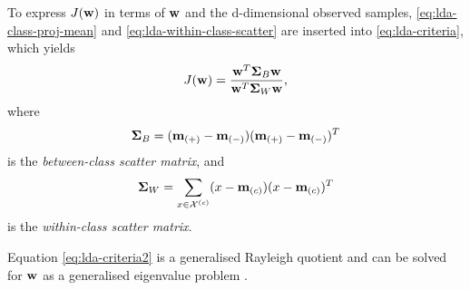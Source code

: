 To express $J(\mathbf{w})$ in terms of $\mathbf{w}$ and the d-dimensional observed samples, \eqref{eq:lda-class-proj-mean} and \eqref{eq:lda-within-class-scatter} are inserted into \eqref{eq:lda-criteria}, which yields
\begin{equation}
\label{eq:lda-criteria2}
J(\w) = \frac{\w^T \Scat_B \w}{\w^T \Scat_W \w},
\end{equation}
where 
\begin{equation}
\label{lda-b-scatter}
\Scat_B = (\m_{(+)}-\m_{(-)})(\m_{(+)}-\m_{(-)})^T
\end{equation}
is the \emph{between-class scatter matrix}, and 
\begin{equation}
\label{lda-w-scatter}
\Scat_W = \sum_{\x \in \Xc^{(c)}}(\x-\m_{(c)})(\x-\m_{(c)})^T
\end{equation}
is the \emph{within-class scatter matrix}.

Equation \ref{eq:lda-criteria2} is a generalised Rayleigh quotient and can be solved for $\mathbf{w}$ as a generalised eigenvalue problem \citep{duda_pattern_2001}. 

